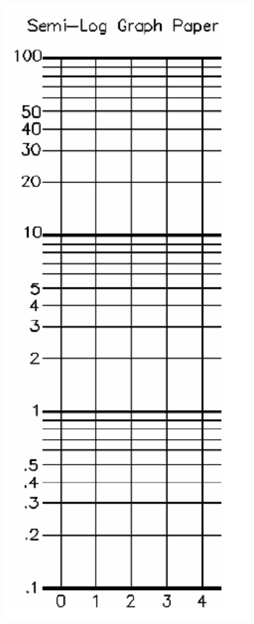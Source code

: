 \begin{minipage}[h]{0.3\textwidth}
\begin{flushright}
        \includegraphics[width=0.8\textwidth]{./Exp3/pic/imagelog.png}
    \end{flushright}
\end{minipage}

